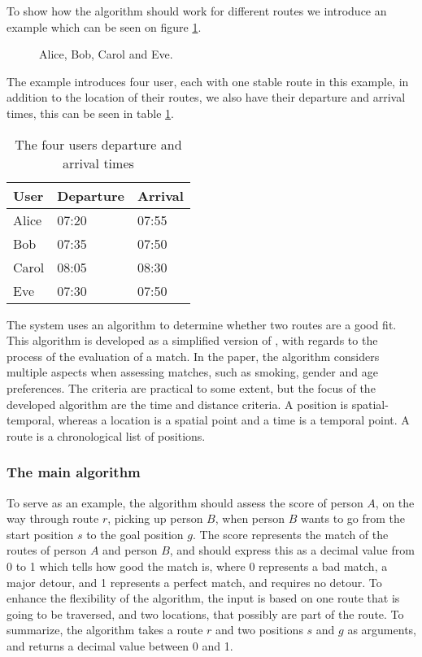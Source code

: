 To show how the algorithm should work for different routes we introduce an example which can be seen on figure \ref{fig:algEx1}.
\begin{figure}
    \centering

    \caption{Alice, Bob, Carol and Eve.}
    \label{fig:algEx1}
\end{figure}
The example introduces four user, each with one stable route in this example, in addition to the location of their routes, we also have their departure and arrival times, this can be seen in table \ref{timetable}.
\begin{table}[]
\centering
\begin{tabular}{@{}lll@{}}
\toprule
\textbf{User} & \textbf{Departure} & \textbf{Arrival} \\ \midrule
Alice         & 07:20                   & 07:55                 \\
Bob           & 07:35                   & 07:50                 \\
Carol         & 08:05                   & 08:30                 \\
Eve           & 07:30                   & 07:50                 \\ \bottomrule
\end{tabular}
\caption{The four users departure and arrival times}
\label{timetable}
\end{table}


The system uses an algorithm to determine whether two routes are a good fit.
This algorithm is developed as a simplified version of \citet{ghoseiri2011real}, with regards to the process of the evaluation of a match.
In the paper, the algorithm considers multiple aspects when assessing matches, such as smoking, gender and age preferences.
The criteria are practical to some extent, but the focus of the developed algorithm are the time and distance criteria.
A position is spatial-temporal, whereas a location is a spatial point and a time is a temporal point.
A route is a chronological list of positions.

\subsubsection{The main algorithm}
To serve as an example, the algorithm should assess the score of person $A$, on the way through route $r$, picking up person $B$, when person $B$ wants to go from the start position $s$ to the goal position $g$. 
The score represents the match of the routes of person $A$ and person $B$, and should express this as a decimal value from 0 to 1 which tells how good the match is, where 0 represents a bad match, a major detour, and 1 represents a perfect match, and requires no detour.
To enhance the flexibility of the algorithm, the input is based on one route that is going to be traversed, and two locations, that possibly are part of the route.
To summarize, the algorithm takes a route $r$ and two positions $s$ and $g$ as arguments, and returns a decimal value between 0 and 1.

